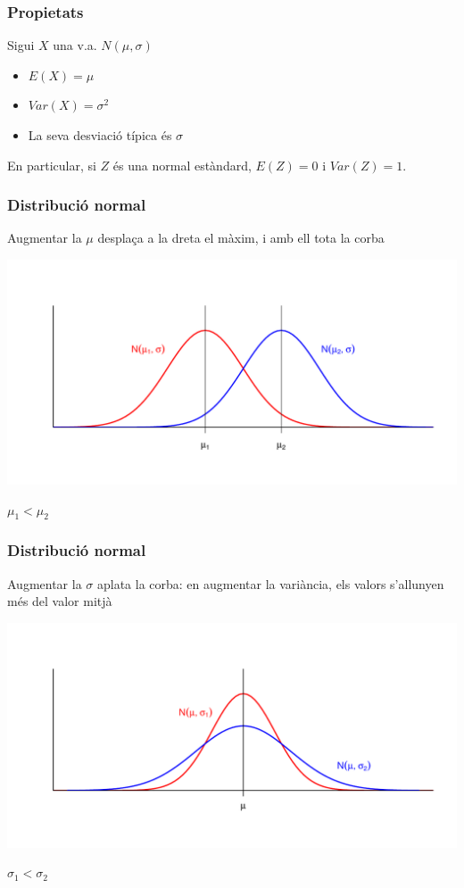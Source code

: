 \documentclass[12pt,t]{beamer}\usepackage[]{graphicx}\usepackage[]{color}
\theoremstyle{plain}
\theoremstyle{definition}
\begin{document}
\begin{frame}
\frametitle{Propietats} 
Sigui $X$ una v.a. $N(\mu,\sigma)$
\medskip

\begin{itemize}


\item$E(X)=\mu$ 
\medskip

\item$Var(X)=\sigma^2$ 
\medskip

\item  La seva desviació típica és $\sigma$
\end{itemize}
\bigskip

En particular, si $Z$ és una normal estàndard, $E(Z)=0$ i $Var(Z)=1$.
\end{frame}



\begin{frame}
\frametitle{Distribució normal}

Augmentar la $\mu$ desplaça a la dreta el màxim, i amb ell tota la corba
\begin{center}
\includegraphics[width=\linewidth]{mu1mu2}

$\mu_1<\mu_2$
\end{center}
\end{frame}




\begin{frame}
\frametitle{Distribució normal}

Augmentar la $\sigma$ aplata la corba: en augmentar la variància, els valors s'allunyen més del valor mitjà
\begin{center}
\includegraphics[width=\linewidth]{sigma1sigma2}

$\sigma_1<\sigma_2$
\end{center}
\end{frame}
\end{document}
